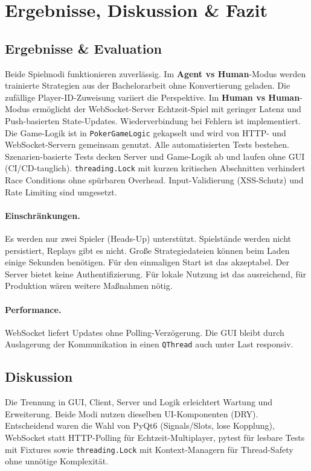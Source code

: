 \section{Ergebnisse, Diskussion \& Fazit}\label{sec:ergebnisse_diskussion_fazit}

\subsection{Ergebnisse \& Evaluation}

Beide Spielmodi funktionieren zuverlässig.
Im \textbf{Agent vs Human}-Modus werden trainierte Strategien aus der Bachelorarbeit ohne Konvertierung geladen. Die zufällige Player-ID-Zuweisung variiert die Perspektive.
Im \textbf{Human vs Human}-Modus ermöglicht der WebSocket-Server Echtzeit-Spiel mit geringer Latenz und Push-basierten State-Updates. Wiederverbindung bei Fehlern ist implementiert.
Die Game-Logik ist in \texttt{PokerGameLogic} gekapselt und wird von HTTP- und WebSocket-Servern gemeinsam genutzt.
Alle automatisierten Tests bestehen. Szenarien-basierte Tests decken Server und Game-Logik ab und laufen ohne GUI (CI/CD-tauglich).
\texttt{threading.Lock} mit kurzen kritischen Abschnitten verhindert Race Conditions ohne spürbaren Overhead. Input-Validierung (XSS-Schutz) und Rate Limiting sind umgesetzt.

\paragraph{Einschränkungen.}
Es werden nur zwei Spieler (Heads-Up) unterstützt. Spielstände werden nicht persistiert, Replays gibt es nicht.
Große Strategiedateien können beim Laden einige Sekunden benötigen. Für den einmaligen Start ist das akzeptabel.
Der Server bietet keine Authentifizierung. Für lokale Nutzung ist das ausreichend, für Produktion wären weitere Maßnahmen nötig.

\paragraph{Performance.}
WebSocket liefert Updates ohne Polling-Verzögerung. Die GUI bleibt durch Auslagerung der Kommunikation in einen \texttt{QThread} auch unter Last responsiv.

\subsection{Diskussion}

Die Trennung in GUI, Client, Server und Logik erleichtert Wartung und Erweiterung. Beide Modi nutzen dieselben UI-Komponenten (DRY).
Entscheidend waren die Wahl von PyQt6 (Signals/Slots, lose Kopplung), WebSocket statt HTTP-Polling für Echtzeit-Multiplayer, pytest für lesbare Tests mit Fixtures sowie \texttt{threading.Lock} mit Kontext-Managern für Thread-Safety ohne unnötige Komplexität.

